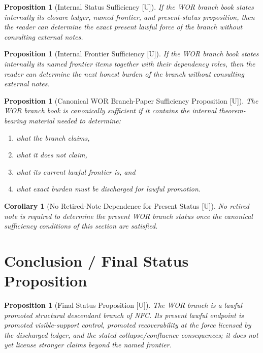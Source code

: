 \documentclass[11pt]{article}
\newtheorem{proposition}[theorem]{Proposition}
\newtheorem{corollary}[theorem]{Corollary}
\theoremstyle{definition}
\theoremstyle{remark}
\newcommand{\U}{\textnormal{[U]}}
\begin{document}
\begin{proposition}[Internal Status Sufficiency {\U}]
If the WOR branch book states internally its closure ledger, named frontier, and present-status proposition, then the reader can determine the exact present lawful force of the branch without consulting external notes.
\end{proposition}

\begin{proposition}[Internal Frontier Sufficiency {\U}]
If the WOR branch book states internally its named frontier items together with their dependency roles, then the reader can determine the next honest burden of the branch without consulting external notes.
\end{proposition}

\begin{proposition}[Canonical WOR Branch-Paper Sufficiency Proposition {\U}]
The WOR branch book is canonically sufficient if it contains the internal theorem-bearing material needed to determine:
\begin{enumerate}[label=(\arabic*)]
    \item what the branch claims,
    \item what it does not claim,
    \item what its current lawful frontier is, and
    \item what exact burden must be discharged for lawful promotion.
\end{enumerate}
\end{proposition}

\begin{corollary}[No Retired-Note Dependence for Present Status {\U}]
No retired note is required to determine the present WOR branch status once the canonical sufficiency conditions of this section are satisfied.
\end{corollary}

\section{Conclusion / Final Status Proposition}

\begin{proposition}[Final Status Proposition {\U}]
The WOR branch is a lawful promoted structural descendant branch of NFC. Its present lawful endpoint is promoted visible-support control, promoted recoverability at the force licensed by the discharged ledger, and the stated collapse/confluence consequences; it does not yet license stronger claims beyond the named frontier.
\end{proposition}
\end{document}
